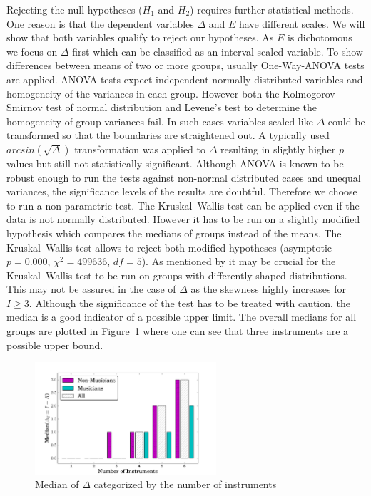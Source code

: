 Rejecting the null hypotheses ($H_1$ and $H_2$) requires further statistical methods. One reason is that the dependent variables $\Delta$ and $E$ have different scales. We will show that both variables qualify to reject our hypotheses.
As $E$ is dichotomous we focus on $\Delta$ first which can be classified as an interval scaled variable. To show differences between means of two or more groups, usually One-Way-ANOVA tests are applied. ANOVA tests expect independent normally distributed variables and homogeneity of the variances in each group. However both the Kolmogorov--Smirnov test of normal distribution and Levene's test to determine the homogeneity of group variances fail. In such cases variables scaled like $\Delta$ could be transformed so that the boundaries are straightened out. A typically used $arcsin(\sqrt{\Delta})$ transformation was applied to $\Delta$ resulting in slightly higher $p$ values but still not statistically significant. Although ANOVA is known to be robust enough to run the tests against non-normal distributed cases and unequal variances, the significance levels of the results are doubtful. Therefore we choose to run a non-parametric test. The Kruskal--Wallis test can be applied even if the data is not normally distributed. However it has to be run on a slightly modified hypothesis which compares the medians of groups instead of the means. The Kruskal--Wallis test allows to reject both modified hypotheses (asymptotic $p = 0.000$, $\chi^2 = 499636$, $df=5$). As mentioned by \cite{fagerland2009} it may be crucial for the Kruskal--Wallis test to be run on groups with differently shaped distributions. This may not be assured in the case of $\Delta$ as the skewness highly increases for $I \geq 3$. Although the significance of the test has to be treated with caution, the median is a good indicator of a possible upper limit. The overall medians for all groups are plotted in Figure~\ref{fig:median} where one can see that three instruments are a possible upper bound.

\begin{figure}[h]
	\centering
	\includegraphics[width=0.6\textwidth]{Chapters/07_Analysis_Experiment/ica/images/diff_medians.pdf}
\caption{Median of $\Delta$ categorized by the number of instruments}
\label{fig:median}
\end{figure}

